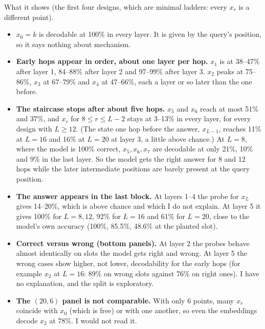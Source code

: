 \documentclass[paper=a4,fontsize=11pt,DIV=11,parskip=half,headings=small,numbers=noendperiod]{scrartcl}
\DeclareRobustCommand{\lead}[1]{\textsf{\bfseries\color{accent}#1}}
\begin{document}
\begin{findbox}{What it shows}
(the first four designs, which are minimal ladders: every $x_r$ is a different point).

\begin{itemize}
\item $x_0=k$ is decodable at 100\% in every layer. It is given by the query’s position, so it says nothing
  about mechanism.
\item \lead{Early hops appear in order, about one layer per hop.} $x_1$ is at 38–47\% after layer 1, 84–88\%
  after layer 2 and 97–99\% after layer 3. $x_2$ peaks at 75–86\%, $x_3$ at 67–79\% and $x_4$ at 47–66\%, each a
  layer or so later than the one before.
\item \lead{The staircase stops after about five hops.} $x_5$ and $x_6$ reach at most 51\% and 37\%, and $x_r$
  for $8\le r\le L-2$ stays at 3–13\% in every layer, for every design with $L\ge12$. (The state one hop before
  the answer, $x_{L-1}$, reaches 11\% at $L=16$ and 16\% at $L=20$ at layer 3, a little above chance.) At $L=8$,
  where the model is 100\% correct, $x_5,x_6,x_7$ are decodable at only 21\%, 10\% and 9\% in the last layer. So
  the model gets the right answer for 8 and 12 hops while the later intermediate positions are barely present at
  the query position.
\item \lead{The answer appears in the last block.} At layers 1–4 the probe for $x_L$ gives 14–20\%, which is
  above chance and which I do not explain. At layer 5 it gives 100\% for $L=8,12$, 92\% for $L=16$ and 61\% for
  $L=20$, close to the model’s own accuracy (100\%, 85.5\%, 48.6\% at the planted slot).
\item \lead{Correct versus wrong (bottom panels).} At layer 2 the probes behave almost identically on slots the
  model gets right and wrong. At layer 5 the wrong cases show higher, not lower, decodability for the early hops
  (for example $x_2$ at $L=16$: 89\% on wrong slots against 76\% on right ones). I have no explanation, and the
  split is exploratory.
\item \lead{The $(20,6)$ panel is not comparable.} With only 6 points, many $x_r$ coincide with $x_0$ (which is
  free) or with one another, so even the embeddings decode $x_2$ at 78\%. I would not read it.
\end{itemize}
\end{findbox}
\end{document}
